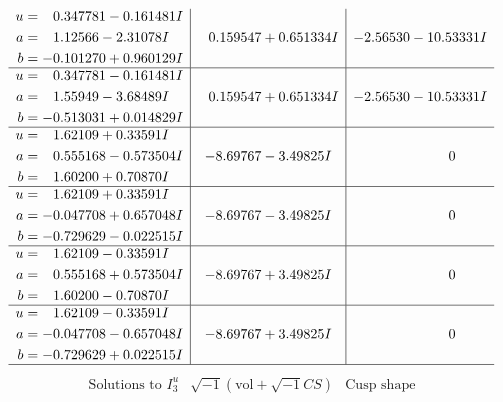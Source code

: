 \documentclass[1p]{elsarticle_modified}
\theoremstyle{definition}
\newcommand{\I}{\sqrt{-1}}
\begin{document}
$$\begin{array}{c|c|c}
\begin{aligned}
u &= \phantom{-}0.347781 - 0.161481 I \\
a &= \phantom{-}1.12566 - 2.31078 I \\
b &= -0.101270 + 0.960129 I\end{aligned}
 & \phantom{-}0.159547 + 0.651334 I & -2.56530 - 10.53331 I \\ \hline\begin{aligned}
u &= \phantom{-}0.347781 - 0.161481 I \\
a &= \phantom{-}1.55949 - 3.68489 I \\
b &= -0.513031 + 0.014829 I\end{aligned}
 & \phantom{-}0.159547 + 0.651334 I & -2.56530 - 10.53331 I \\ \hline\begin{aligned}
u &= \phantom{-}1.62109 + 0.33591 I \\
a &= \phantom{-}0.555168 - 0.573504 I \\
b &= \phantom{-}1.60200 + 0.70870 I\end{aligned}
 & -8.69767 - 3.49825 I & \phantom{-0.000000 } 0 \\ \hline\begin{aligned}
u &= \phantom{-}1.62109 + 0.33591 I \\
a &= -0.047708 + 0.657048 I \\
b &= -0.729629 - 0.022515 I\end{aligned}
 & -8.69767 - 3.49825 I & \phantom{-0.000000 } 0 \\ \hline\begin{aligned}
u &= \phantom{-}1.62109 - 0.33591 I \\
a &= \phantom{-}0.555168 + 0.573504 I \\
b &= \phantom{-}1.60200 - 0.70870 I\end{aligned}
 & -8.69767 + 3.49825 I & \phantom{-0.000000 } 0 \\ \hline\begin{aligned}
u &= \phantom{-}1.62109 - 0.33591 I \\
a &= -0.047708 - 0.657048 I \\
b &= -0.729629 + 0.022515 I\end{aligned}
 & -8.69767 + 3.49825 I & \phantom{-0.000000 } 0\\
 \hline 
 \end{array}$$\newpage$$\begin{array}{c|c|c}  
\text{Solutions to }I^u_{3}& \I (\text{vol} + \sqrt{-1}CS) & \text{Cusp shape}\\
 \hline 
\begin{aligned}

\end{aligned}
\end{array}$$
\end{document}
